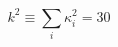 \begin{equation}
\label{ksquareddP_7}
k^{2} \equiv \textstyle{\sum_{i}} \kappa^{2}_{i} = 30
\end{equation}

